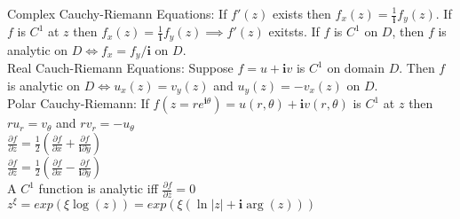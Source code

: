 \documentclass{article}%
\newcommand\abs[1]{\left|#1\right|}
\newcommand\I{\textbf{i}}
\begin{document}
Complex Cauchy-Riemann Equations: If $f'(z)$ exists then $f_x(z) = \frac{1}{\I} f_y(z)$. If $f$ is $C^1$ at $z$ then $f_x(z)=\frac{1}{\I} f_y(z) \implies f'(z)$ exitsts. If $f$ is $C^1$ on $D$, then $f$ is analytic on $D \iff f_x = f_y / \I$ on $D$. \\
Real Cauch-Riemann Equations: Suppose $f=u+\I v$ is $C^1$ on domain $D$. Then $f$ is analytic on $D \iff u_x(z) = v_y(z)$ and $u_y(z) = -v_x(z)$ on $D$. \\
Polar Cauchy-Riemann: If $f(z=re^{\I\theta})=u(r,\theta)+\I v(r,\theta)$ is $C^1$ at $z$ then $r u_r = v_{\theta}$ and $r v_r=-u_{\theta}$ \\
$\frac{\partial f}{\partial z} = \frac{1}{2}\left(\frac{\partial f}{\partial x} + \frac{\partial f}{\I \partial  y}\right) $ \\
$\frac{\partial f}{\partial \bar{z}} = \frac{1}{2}\left(\frac{\partial f}{\partial x} - \frac{\partial f}{\I \partial  y}\right) $ \\
A $C^1$ function is analytic iff $\frac{\partial f}{\partial \bar{z}} = 0$ \\
$z^{\xi} = exp(\xi \log(z)) = exp(\xi (\ln\abs{z} + \I \arg(z)))$\\
\end{document}
